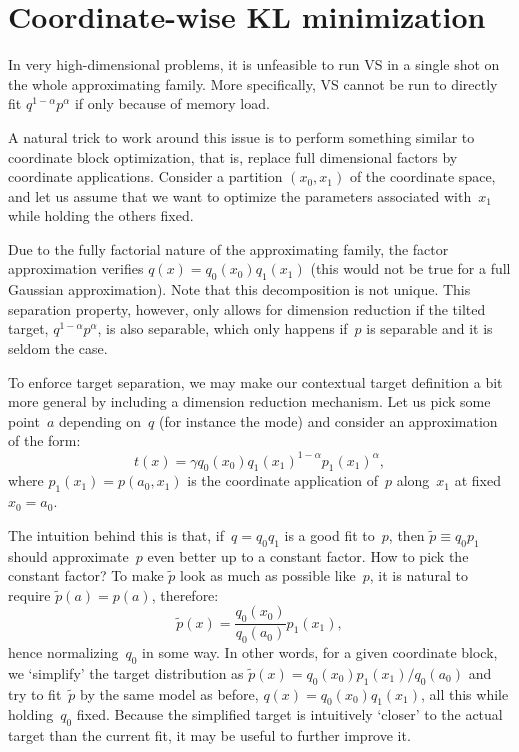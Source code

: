 \documentclass{article}
\begin{document}
\section{Coordinate-wise KL minimization}

In very high-dimensional problems, it is unfeasible to run VS in a single shot on the whole approximating family. More specifically, VS cannot be run to directly fit $q^{1-\alpha}p^\alpha$ if only because of memory load.

A natural trick to work around this issue is to perform something similar to coordinate block optimization, that is, replace full dimensional factors by coordinate applications. Consider a partition $(x_0,x_1)$ of the coordinate space, and let us assume that we want to optimize the parameters associated with~$x_1$ while holding the others fixed. 

Due to the fully factorial nature of the approximating family, the factor approximation verifies $q(x)=q_0(x_0)q_1(x_1)$ (this would not be true for a full Gaussian approximation). Note that this decomposition is not unique.
This separation property, however, only allows for dimension reduction if the tilted target, $q^{1-\alpha}p^\alpha$, is also separable, which only happens if~$p$ is separable and it is seldom the case. 

To enforce target separation, we may make our contextual target definition a bit more general by including a dimension reduction mechanism. Let us pick some point~$a$ depending on~$q$ (for instance the mode) and consider an approximation of the form:
$$
t(x) = \gamma q_0(x_0) q_1(x_1)^{1-\alpha}p_1(x_1)^\alpha,
$$
where $p_1(x_1)=p(a_0, x_1)$ is the coordinate application of~$p$ along~$x_1$ at fixed $x_0=a_0$. 

The intuition behind this is that, if~$q=q_0q_1$ is a good fit to~$p$, then $\tilde{p}\equiv q_0p_1$ should approximate~$p$ even better up to a constant factor. How to pick the constant factor? To make $\tilde{p}$ look as much as possible like~$p$, it is natural to require $\tilde{p}(a)=p(a)$, therefore:
$$
\tilde{p}(x) = \frac{q_0(x_0)}{q_0(a_0)} p_1(x_1),
$$
hence normalizing~$q_0$ in some way. In other words, for a given coordinate block, we `simplify' the target distribution as $\tilde{p}(x)=q_0(x_0)p_1(x_1)/q_0(a_0)$ and try to fit~$\tilde{p}$ by the same model as before, $q(x)=q_0(x_0)q_1(x_1)$, all this while holding~$q_0$ fixed. Because the simplified target is intuitively `closer' to the actual target than the current fit, it may be useful to further improve it.
\end{document}
